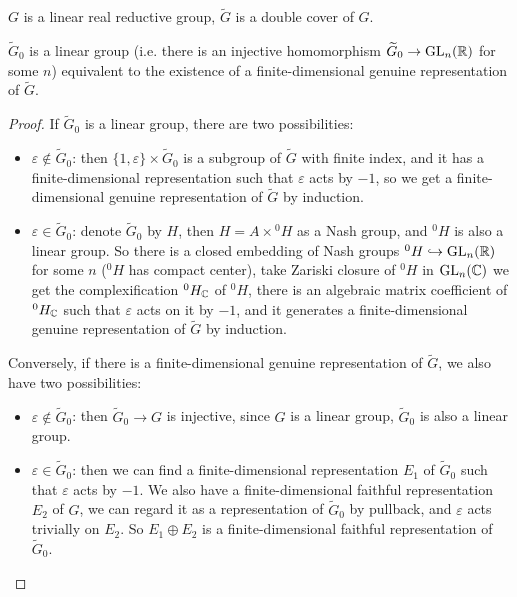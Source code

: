 

$G$ is a linear real reductive group, $\widetilde{G}$ is a double cover of $G$.

\begin{thm}
  $\widetilde{G}_{0}$ is a linear group (i.e. there is an injective homomorphism $\widetilde{G}_0 \to \operatorname{GL}_n(\mathbb{R})$ for some $n$) equivalent to the existence of a finite-dimensional genuine representation of $\widetilde{G}$.
\end{thm}


\begin{proof}


  If $\widetilde{G}_0$ is a linear group, there are two possibilities:

  \begin{itemize}
    \item $ \varepsilon  \notin \widetilde{G}_0$: then $\{ 1, \varepsilon\} \times \widetilde{G}_0$ is a subgroup of $\widetilde{G}$ with finite index, and it has a finite-dimensional representation such that $\varepsilon$ acts by $-1$, so we get a finite-dimensional genuine representation of $\widetilde{G}$ by induction.
    \item $\varepsilon \in \widetilde{G}_0$: denote $\widetilde{G}_0$ by $H$, then $H = A \times {^{0}H}$ as a Nash group, and $^0H$ is also a linear group. So there is a closed embedding of Nash groups $^0H \hookrightarrow \operatorname{GL}_n(\mathbb{R})$ for some $n$ ($^0H$ has compact center), take Zariski closure of $^0H$ in $\operatorname{GL}_n(\mathbb{C})$ we get the complexification $^0H_{\mathbb{C}}$ of $^0H$, there is an algebraic matrix coefficient of $^0H_{\mathbb{C}}$ such that $\varepsilon$ acts on it by $-1$, and it generates a finite-dimensional genuine representation of $\widetilde{G}$ by induction.
  \end{itemize}


  Conversely, if there is a finite-dimensional genuine representation of $\widetilde{G}$, we also have two possibilities:
  \begin{itemize}
    \item $\varepsilon \notin \widetilde{G}_0$: then $\widetilde{G}_0 \to G$ is injective, since $G$ is a linear group, $\widetilde{G}_0$ is also a linear group.
    \item $\varepsilon \in \widetilde{G}_0$: then we can find a finite-dimensional representation $E_1$ of $\widetilde{G}_0$ such that $\varepsilon$ acts by $-1$. We also have a finite-dimensional faithful representation $E_2$ of $G$, we can regard it as a representation of $\widetilde{G}_0$ by pullback, and $\varepsilon$ acts trivially on $E_2$. So $E_1 \oplus E_2$ is a finite-dimensional faithful representation of $\widetilde{G}_0$.
  \end{itemize}
\end{proof}


